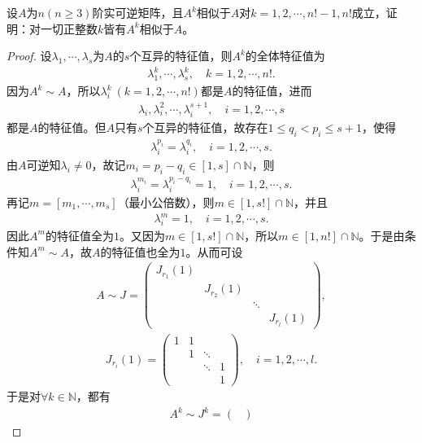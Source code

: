 \documentclass[../../main.tex]{subfiles}%
\begin{document}
\begin{example}
设$A$为$n(n \geqslant 3)$阶实可逆矩阵，且$A^k$相似于$A$对$k = 1,2,\cdots,n!-1,n!$成立，证明：对一切正整数$k$皆有$A^k$相似于$A$。
\end{example}
\begin{proof}
设$\lambda_1,\cdots,\lambda_s$为$A$的$s$个互异的特征值，则$A^k$的全体特征值为
\begin{align*}
\lambda_1^k,\cdots,\lambda_s^k,\quad k=1,2,\cdots,n!.
\end{align*}
因为$A^k\sim A$，所以$\lambda_i^k\ (k=1,2,\cdots,n!)$都是$A$的特征值，进而
\begin{align*}
\lambda_i,\lambda_i^2,\cdots,\lambda_i^{s+1},\quad i=1,2,\cdots,s
\end{align*}
都是$A$的特征值。但$A$只有$s$个互异的特征值，故存在$1\leqslant q_i<p_i\leqslant s+1$，使得
\begin{align*}
\lambda_i^{p_i}=\lambda_i^{q_i},\quad i=1,2,\cdots,s.
\end{align*}
由$A$可逆知$\lambda_i\ne 0$，故记$m_i=p_i-q_i\in [1,s]\cap\mathbb{N}$，则
\begin{align*}
\lambda_i^{m_i}=\lambda_i^{p_i-q_i}=1,\quad i=1,2,\cdots,s.
\end{align*}
再记$m=[m_1,\cdots,m_s]$（最小公倍数），则$m\in [1,s!]\cap\mathbb{N}$，并且
\begin{align*}
\lambda_i^m=1,\quad i=1,2,\cdots,s.
\end{align*}
因此$A^m$的特征值全为$1$。又因为$m\in [1,s!]\cap\mathbb{N}$，所以$m\in [1,n!]\cap\mathbb{N}$。于是由条件知$A^m\sim A$，故$A$的特征值也全为$1$。从而可设
\begin{align*}
A\sim J=\begin{pmatrix}
J_{r_1}(1) & & & \\
& J_{r_2}(1) & & \\
& & \ddots & \\
& & & J_{r_l}(1)
\end{pmatrix},
\end{align*}
\begin{align*}
J_{r_i}(1)=\begin{pmatrix}
1 & 1 & & \\
& 1 & \ddots & \\
& & \ddots & 1 \\
& & & 1
\end{pmatrix},\quad i=1,2,\cdots,l.
\end{align*}
于是对$\forall k\in\mathbb{N}$，都有
\begin{align*}
A^k\sim J^k=\begin{pmatrix}

\end{pmatrix}
\end{align*}
\end{proof}
\end{document}
